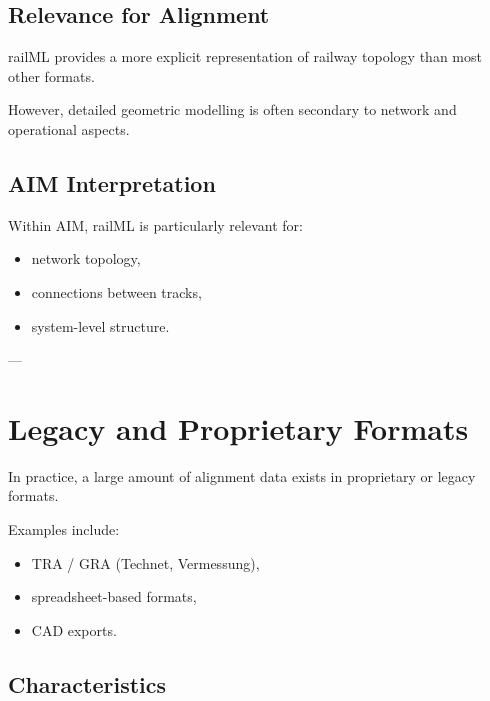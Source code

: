 \subsection{Relevance for Alignment}

\begin{remark}
railML provides a more explicit representation of railway topology than
most other formats.
\end{remark}

\begin{remark}
However, detailed geometric modelling is often secondary to network and
operational aspects.
\end{remark}

\subsection{AIM Interpretation}

\begin{remark}
Within AIM, railML is particularly relevant for:
\begin{itemize}
\item network topology,
\item connections between tracks,
\item system-level structure.
\end{itemize}
\end{remark}

---

\section{Legacy and Proprietary Formats}

\begin{remark}
In practice, a large amount of alignment data exists in proprietary or
legacy formats.
\end{remark}

\begin{remark}
Examples include:
\begin{itemize}
\item TRA / GRA (Technet, Vermessung),
\item spreadsheet-based formats,
\item CAD exports.
\end{itemize}
\end{remark}

\subsection{Characteristics}

